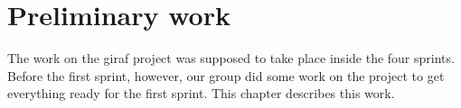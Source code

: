 \chapter{Preliminary work}

The work on the \gls{giraf} project was supposed to take place inside the four sprints. Before the first sprint, however, our group did some work on the project to get everything ready for the first sprint. This chapter describes this work.